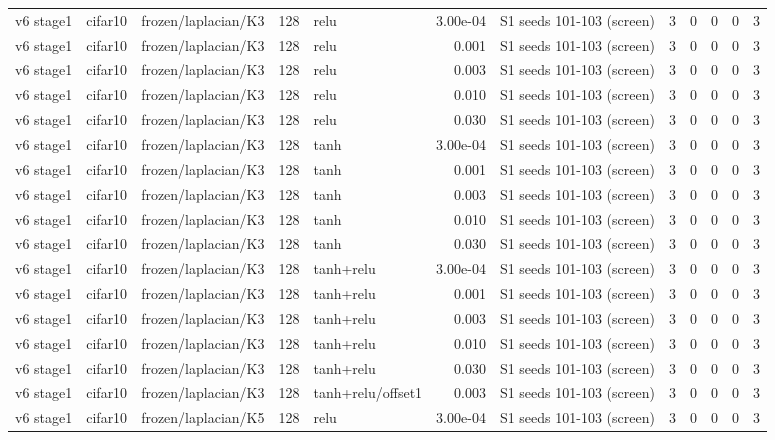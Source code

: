 \begin{table}[htbp]
{\begin{tabular}{@{}lllrlrlrrrrr@{}}
v6 stage1 & cifar10 & frozen/laplacian/K3 & 128 & relu & 3.00e-04 & S1 seeds 101-103 (screen) & 3 & 0 & 0 & 0 & 3 \\
v6 stage1 & cifar10 & frozen/laplacian/K3 & 128 & relu & 0.001 & S1 seeds 101-103 (screen) & 3 & 0 & 0 & 0 & 3 \\
v6 stage1 & cifar10 & frozen/laplacian/K3 & 128 & relu & 0.003 & S1 seeds 101-103 (screen) & 3 & 0 & 0 & 0 & 3 \\
v6 stage1 & cifar10 & frozen/laplacian/K3 & 128 & relu & 0.010 & S1 seeds 101-103 (screen) & 3 & 0 & 0 & 0 & 3 \\
v6 stage1 & cifar10 & frozen/laplacian/K3 & 128 & relu & 0.030 & S1 seeds 101-103 (screen) & 3 & 0 & 0 & 0 & 3 \\
v6 stage1 & cifar10 & frozen/laplacian/K3 & 128 & tanh & 3.00e-04 & S1 seeds 101-103 (screen) & 3 & 0 & 0 & 0 & 3 \\
v6 stage1 & cifar10 & frozen/laplacian/K3 & 128 & tanh & 0.001 & S1 seeds 101-103 (screen) & 3 & 0 & 0 & 0 & 3 \\
v6 stage1 & cifar10 & frozen/laplacian/K3 & 128 & tanh & 0.003 & S1 seeds 101-103 (screen) & 3 & 0 & 0 & 0 & 3 \\
v6 stage1 & cifar10 & frozen/laplacian/K3 & 128 & tanh & 0.010 & S1 seeds 101-103 (screen) & 3 & 0 & 0 & 0 & 3 \\
v6 stage1 & cifar10 & frozen/laplacian/K3 & 128 & tanh & 0.030 & S1 seeds 101-103 (screen) & 3 & 0 & 0 & 0 & 3 \\
v6 stage1 & cifar10 & frozen/laplacian/K3 & 128 & tanh+relu & 3.00e-04 & S1 seeds 101-103 (screen) & 3 & 0 & 0 & 0 & 3 \\
v6 stage1 & cifar10 & frozen/laplacian/K3 & 128 & tanh+relu & 0.001 & S1 seeds 101-103 (screen) & 3 & 0 & 0 & 0 & 3 \\
v6 stage1 & cifar10 & frozen/laplacian/K3 & 128 & tanh+relu & 0.003 & S1 seeds 101-103 (screen) & 3 & 0 & 0 & 0 & 3 \\
v6 stage1 & cifar10 & frozen/laplacian/K3 & 128 & tanh+relu & 0.010 & S1 seeds 101-103 (screen) & 3 & 0 & 0 & 0 & 3 \\
v6 stage1 & cifar10 & frozen/laplacian/K3 & 128 & tanh+relu & 0.030 & S1 seeds 101-103 (screen) & 3 & 0 & 0 & 0 & 3 \\
v6 stage1 & cifar10 & frozen/laplacian/K3 & 128 & tanh+relu/offset1 & 0.003 & S1 seeds 101-103 (screen) & 3 & 0 & 0 & 0 & 3 \\
v6 stage1 & cifar10 & frozen/laplacian/K5 & 128 & relu & 3.00e-04 & S1 seeds 101-103 (screen) & 3 & 0 & 0 & 0 & 3 \\

\end{tabular}}
\end{table}
